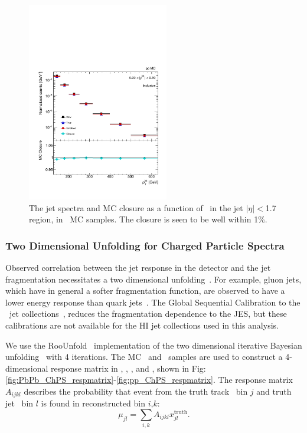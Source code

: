 \begin{figure}[ht]
\centering
\includegraphics[page=5, width=0.55\textwidth]{figures_corrections/spect_closure_pp_MC.pdf}
\caption{The jet spectra and MC closure as a function of \ptjet\ in the jet $|\eta| < $1.7 region, in \pp\ MC samples. The closure is seen to be well within 1\%.}
\label{fig:pp_jetspect_closure}
\end{figure}



\subsubsection{Two Dimensional Unfolding for Charged Particle Spectra}
\label{sec:2dunfolding}


Observed correlation between the jet response in the detector and the jet fragmentation necessitates a two dimensional unfolding~\cite{ATLAS502FFConf}. 
For example, gluon jets, which have in general a softer fragmentation function, are observed to have a lower energy response than quark jets~\cite{Aad:2014bia}.  The Global Sequential Calibration to the \pp\ jet collections~\cite{ATLAS:2015oia}, reduces the fragmentation dependence to the JES, but these calibrations are not available for the HI jet collections used in this analysis.

We use the RooUnfold~\cite{Adye:2011gm} implementation of the two dimensional iterative Bayesian unfolding~\cite{D'Agostini:1994zf} with 4 iterations. The MC \pbpb\ and \pp\ samples are used to construct a 4-dimensional response matrix in \pttrktruth, \ptjettruth, \pttrkreco, and \ptjetreco, shown in Fig:\ref{fig:PbPb_ChPS_respmatrix}-\ref{fig:pp_ChPS_respmatrix}. The response matrix $A_{ijkl}$ describes the probability that event from the truth track \pt\  bin $j$ and truth jet \pT\ bin $l$ is found in reconstructed bin $i$,$k$:
\begin{equation}
\mu_{jl} = \sum_{i,k} A_{ijkl}x^{\text{truth}}_{jl}.
\end{equation} 


